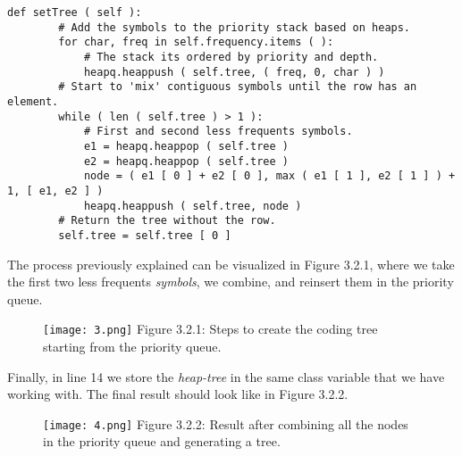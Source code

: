 \begin{lstlisting}
def setTree ( self ):
        # Add the symbols to the priority stack based on heaps.
        for char, freq in self.frequency.items ( ):
            # The stack its ordered by priority and depth.
            heapq.heappush ( self.tree, ( freq, 0, char ) )
        # Start to 'mix' contiguous symbols until the row has an element.
        while ( len ( self.tree ) > 1 ):
            # First and second less frequents symbols.
            e1 = heapq.heappop ( self.tree )
            e2 = heapq.heappop ( self.tree )
            node = ( e1 [ 0 ] + e2 [ 0 ], max ( e1 [ 1 ], e2 [ 1 ] ) + 1, [ e1, e2 ] )
            heapq.heappush ( self.tree, node )
        # Return the tree without the row.
        self.tree = self.tree [ 0 ]
\end{lstlisting} \hfill \break

The process previously explained can be visualized in Figure 3.2.1, where we take the first two less frequents {\itshape symbols}, we combine, and reinsert them in the priority queue.

\begin{figure}[H]
\texttt{[image: 3.png]}
\centering \linebreak \linebreak Figure 3.2.1: Steps to create the coding tree starting from the priority queue.
\end{figure} \hfill \break

Finally, in line 14 we store the {\itshape heap-tree} in the same class variable that we have working with. The final result should look like in Figure 3.2.2. \hfill \break

\begin{figure}[H]
\texttt{[image: 4.png]}
\centering \linebreak \linebreak Figure 3.2.2: Result after combining all the nodes in the priority queue and generating a tree.
\end{figure}

\pagebreak